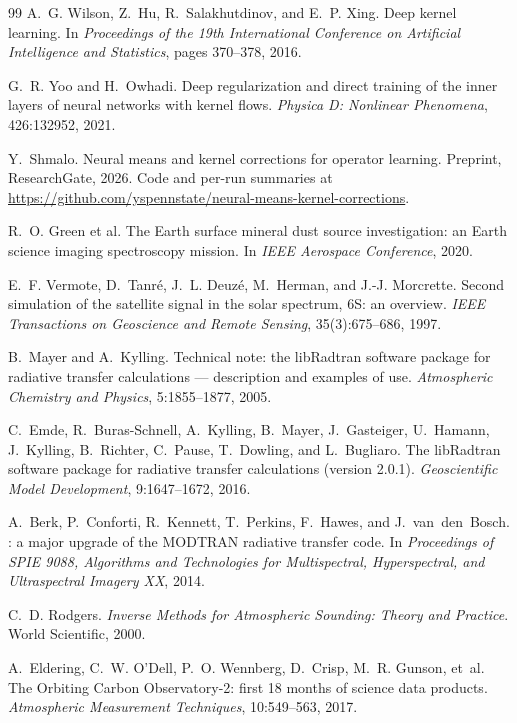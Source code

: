 \begin{thebibliography}{99}
A.~G. Wilson, Z.~Hu, R.~Salakhutdinov, and E.~P. Xing.
\newblock Deep kernel learning.
\newblock In \emph{Proceedings of the 19th International Conference on Artificial
Intelligence and Statistics}, pages 370--378, 2016.

G.~R. Yoo and H.~Owhadi.
\newblock Deep regularization and direct training of the inner layers of neural networks with
kernel flows.
\newblock \emph{Physica D: Nonlinear Phenomena}, 426:132952, 2021.

Y.~Shmalo.
\newblock Neural means and kernel corrections for operator learning.
\newblock Preprint, ResearchGate, 2026. Code and per-run summaries at
\url{https://github.com/yspennstate/neural-means-kernel-corrections}.

R.~O. Green et al.
\newblock The Earth surface mineral dust source investigation: an Earth science imaging
spectroscopy mission.
\newblock In \emph{IEEE Aerospace Conference}, 2020.

E.~F. Vermote, D.~Tanr\'e, J.~L. Deuz\'e, M.~Herman, and J.-J. Morcrette.
\newblock Second simulation of the satellite signal in the solar spectrum, 6S: an overview.
\newblock \emph{IEEE Transactions on Geoscience and Remote Sensing}, 35(3):675--686, 1997.

B.~Mayer and A.~Kylling.
\newblock Technical note: the {libRadtran} software package for radiative transfer
calculations --- description and examples of use.
\newblock \emph{Atmospheric Chemistry and Physics}, 5:1855--1877, 2005.

C.~Emde, R.~Buras-Schnell, A.~Kylling, B.~Mayer, J.~Gasteiger, U.~Hamann, J.~Kylling,
B.~Richter, C.~Pause, T.~Dowling, and L.~Bugliaro.
\newblock The {libRadtran} software package for radiative transfer calculations (version 2.0.1).
\newblock \emph{Geoscientific Model Development}, 9:1647--1672, 2016.

A.~Berk, P.~Conforti, R.~Kennett, T.~Perkins, F.~Hawes, and J.~van~den~Bosch.
: a major upgrade of the {MODTRAN} radiative transfer code.
\newblock In \emph{Proceedings of SPIE 9088, Algorithms and Technologies for Multispectral,
Hyperspectral, and Ultraspectral Imagery XX}, 2014.

C.~D. Rodgers.
\newblock \emph{Inverse Methods for Atmospheric Sounding: Theory and Practice}.
\newblock World Scientific, 2000.

A.~Eldering, C.~W. O'Dell, P.~O. Wennberg, D.~Crisp, M.~R. Gunson, et~al.
\newblock The {Orbiting Carbon Observatory-2}: first 18 months of science data products.
\newblock \emph{Atmospheric Measurement Techniques}, 10:549--563, 2017.


\end{thebibliography}
